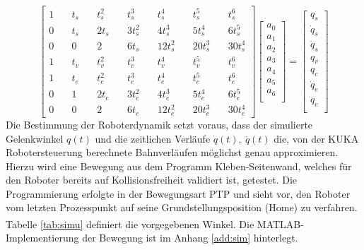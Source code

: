 \begin{equation}
	\label{eqn:lgs}
	\left[	\begin{matrix}
		1&\quad    t_s&\quad          	t_s^2&\quad              	t_s^3&\quad         	t_s^4&\quad              	t_s^5&\quad          	t_s^6\\
		0&\quad    t_s&\quad          	2t_s&\quad              	3t_s^2&\quad        	4t_s^3&\quad            	5t_s^4&\quad        	6t_s^5\\
		0&\quad    0&\quad         		2&\quad              	  	6t_s&\quad         	 	12t_s^2&\quad           	20t_s^3&\quad       	30t_s^4\\
		1&\quad    t_v&\quad         	t_v^2&\quad              	t_v^3&\quad         	t_v^4&\quad             	t_v^5&\quad          	t_v^6\\
		1&\quad    t_e&\quad        	t_e^2&\quad              	t_e^3&\quad          	t_e^4&\quad             	t_e^5&\quad          	t_e^6\\
		0&\quad    1&\quad   	   		2t_e&\quad              	3t_e^2&\quad        	4t_e^3&\quad           		5t_e^4&\quad        	6t_e^5\\   
		0&\quad    0&\quad          	2&\quad                 	6t_e&\quad          	12t_e^2&\quad           	20t_e^3&\quad       	30t_e^4
	\end{matrix}\right]
	\left[	\begin{matrix}
		a_0\\
		a_1\\
		a_2\\
		a_3\\
		a_4\\
		a_5\\
		a_6\\		
	\end{matrix}\right] = 
		\left[	\begin{matrix}
		q_s\\
		\dot{q}_s\\
		\ddot{q}_s\\
		q_v\\
		q_e\\
		\dot{q}_e\\
		\ddot{q}_e\\		
	\end{matrix}\right]
\end{equation}
%
Die Bestimmung der Roboterdynamik setzt voraus, dass der simulierte Gelenkwinkel $q(t)$ und die zeitlichen Verläufe  $\dot{q}(t), ~\ddot{q}(t)$  die, von der KUKA Robotersteuerung berechnete Bahnverläufen möglichst genau approximieren. Hierzu wird eine Bewegung aus dem Programm Kleben-Seitenwand, welches für den Roboter bereits auf Kollisionsfreiheit validiert ist, getestet. Die Programmierung erfolgte in der Bewegungsart PTP und sieht vor, den Roboter vom letzten Prozesspunkt auf seine Grundstellungsposition (Home) zu verfahren. Tabelle \ref{tab:simu} definiert die vorgegebenen Winkel. Die MATLAB\textsuperscript{\textregistered}-Implementierung der Bewegung ist im Anhang \ref{add:sim} hinterlegt.
